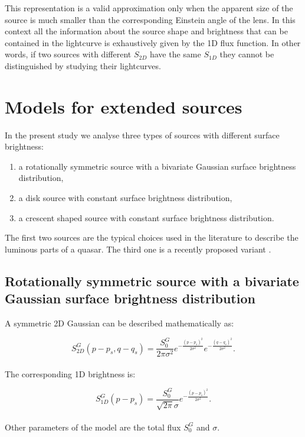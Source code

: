 \documentclass[usenatbib]{mn2e}
\begin{document}
This representation is a valid approximation only when the apparent size of the source is much smaller than the corresponding Einstein angle of the lens. In this context 
all the information about the source shape and brightness that can be contained in the lightcurve is exhaustively given by the 1D flux function.
In other words, if two sources with different $S_{2D}$ have the same $S_{1D}$ they cannot be distinguished by studying their lightcurves.
 
 
\section{Models for extended sources}\label{sec:source-models}

In the present study we analyse three types of sources with different surface brightness: 
\begin{enumerate}
 \renewcommand{\theenumi}{(\arabic{enumi})}
  \item a rotationally symmetric source with a bivariate Gaussian surface brightness distribution,
  \item a disk source with constant surface brightness distribution,
  \item a crescent shaped source with constant surface brightness distribution.
\end{enumerate}
The first two sources are the typical choices used in the literature to describe the luminous parts of a quasar. 
The third one is a recently proposed variant \citep{2013MNRAS.434..765K}.




\subsection{Rotationally symmetric source with a bivariate Gaussian surface brightness distribution}\label{subsec:gaussian}

A symmetric 2D Gaussian can be described mathematically as:

\begin{equation}
 S_{2D}^G(p-p_s, q-q_s) = \frac{S_0^G}{2 \pi \sigma^2} e^{-\frac{(p-p_s)^2}{2 \sigma^2}} e^{-\frac{(q-q_s)^2}{2 \sigma^2}}.
\end{equation}
\\
The corresponding 1D brightness is:

\begin{equation}
 S_{1D}^G(p-p_s) = \frac{S_0^G}{\sqrt{2 \pi} \sigma} e^{-\frac{(p-p_s)^2}{2 \sigma^2}}.
\end{equation}
\\
Other parameters of the model are the total flux $S_0^G$ and $\sigma$. 
\end{document}
